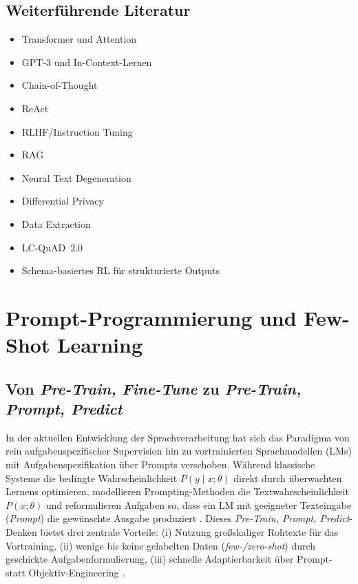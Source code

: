 \subsection*{Weiterführende Literatur}
\begin{itemize}
  \item Transformer und Attention \cite{vaswani2017attention}
  \item GPT-3 und In-Context-Lernen \cite{brown2020language}
  \item Chain-of-Thought \cite{wei2022chain}
  \item ReAct \cite{yao2023react}
  \item RLHF/Instruction Tuning \cite{ouyang2022training}
  \item RAG \cite{lewis2020rag}
  \item Neural Text Degeneration \cite{holtzman2020curious}
  \item Differential Privacy \cite{abadi2016deep}
  \item Data Extraction \cite{carlini2021extracting}
  \item LC-QuAD~2.0 \cite{dubey2019lcquad2}
  \item Schema-basiertes RL für strukturierte Outputs \cite{cong2023schema}
\end{itemize}






\section{Prompt-Programmierung und Few-Shot Learning}
\label{sec:Prompt-Programmierung/Few-shot Learning}


\subsection{Von \emph{Pre-Train, Fine-Tune} zu \emph{Pre-Train, Prompt, Predict}}
In der aktuellen Entwicklung der Sprachverarbeitung hat sich das Paradigma von rein aufgaben\-spezifischer Supervision hin zu vortrainierten Sprachmodellen (LMs) mit Aufgabenspezifikation über Prompts verschoben. Während klassische Systeme die bedingte Wahrscheinlichkeit \(P(y \mid x;\theta)\) direkt durch überwachten Lernens optimieren, modellieren Prompting-Methoden die Textwahrscheinlichkeit \(P(x;\theta)\) und reformulieren Aufgaben so, dass ein LM mit geeigneter Texteingabe (\emph{Prompt}) die gewünschte Ausgabe produziert \cite{liu2023survey}. Dieses \emph{Pre-Train, Prompt, Predict}-Denken bietet drei zentrale Vorteile: (i) Nutzung großskaliger Rohtexte für das Vortraining, (ii) wenige bis keine gelabelten Daten (\emph{few-/zero-shot}) durch geschickte Aufgabenformulierung, (iii) schnelle Adaptierbarkeit über Prompt- statt Objektiv-Engineering \cite{liu2023survey}.

